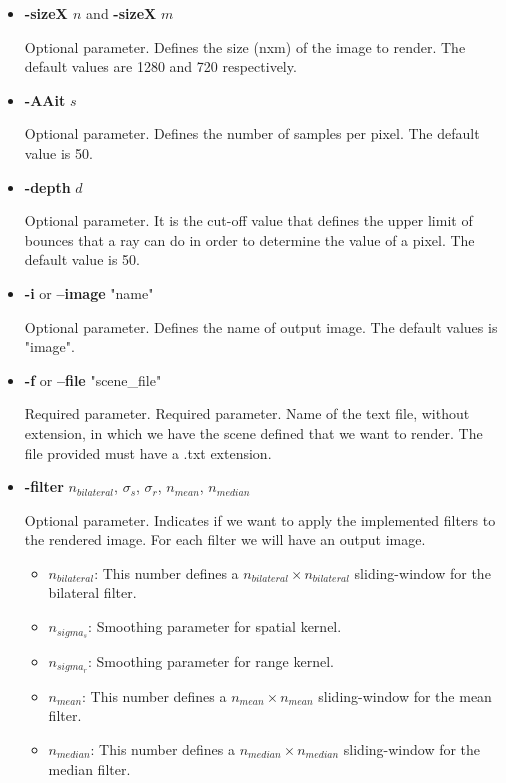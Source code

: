 \documentclass[titlepage,12pt]{report}
\begin{document}
\begin{itemize}

\item \textbf{-sizeX $n$} and \textbf{-sizeX} $m$

Optional parameter. Defines the size (nxm) of the image to render. The default values are 1280 and 720 respectively.

\item \textbf{-AAit} $s$

Optional parameter. Defines the number of samples per pixel. The default value is 50.

\item \textbf{-depth} $d$

Optional parameter. It is the cut-off value that defines the upper limit of bounces that a ray can do in order to determine the value of a pixel. The default value is 50.

\item \textbf{-i} or \textbf{--image} "name"

Optional parameter. Defines the name of output image. The default values is "image".

\item \textbf{-f} or \textbf{--file} "scene\_file"

Required parameter. Required parameter. Name of the text file, without extension, in which we have the scene defined that we want to render. The file provided must have a .txt extension.

\item \textbf{-filter} $n_{bilateral}$, $\sigma_s$, $\sigma_r$, $n_{mean}$, $n_{median}$

Optional parameter. Indicates if we want to apply the implemented filters to the rendered image. For each filter we will have an output image.

\begin{itemize}
\item $n_{bilateral}$: This number defines a $n_{bilateral} \times n_{bilateral}$ sliding-window for the bilateral filter.
\item $n_{sigma_s}$: Smoothing parameter for spatial kernel.
\item $n_{sigma_r}$: Smoothing parameter for range kernel.
\item $n_{mean}$: This number defines a $n_{mean} \times n_{mean}$ sliding-window for the mean filter.
\item $n_{median}$: This number defines a $n_{median} \times n_{median}$ sliding-window for the median filter.
\end{itemize}


\end{itemize}
\end{document}
